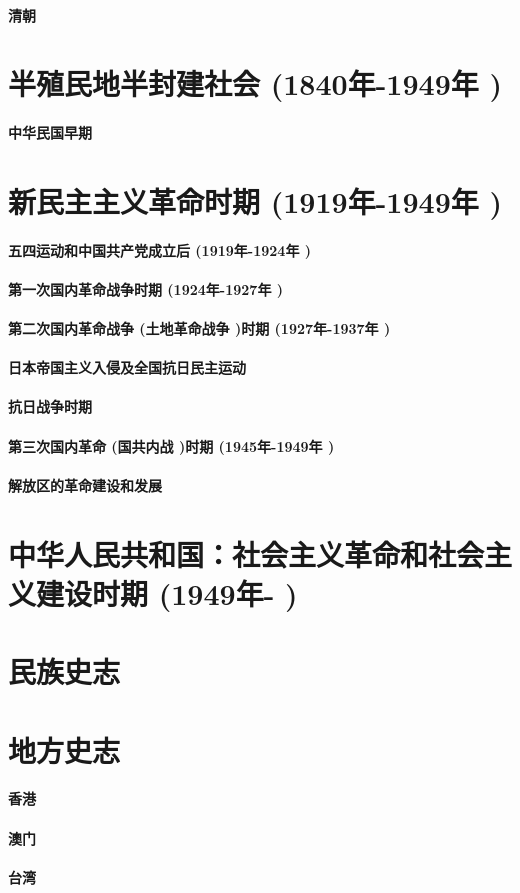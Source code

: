 \documentclass[UTF8]{../../RepresentationUniverse}
\begin{document}
    \subsubsection{清朝}
\chapter{半殖民地半封建社会 (1840年-1949年 )}
    \subsubsection{中华民国早期}
\chapter{新民主主义革命时期 (1919年-1949年 )}
    \subsubsection{五四运动和中国共产党成立后 (1919年-1924年 )}
    \subsubsection{第一次国内革命战争时期 (1924年-1927年 )}
    \subsubsection{第二次国内革命战争 (土地革命战争 )时期 (1927年-1937年 )}
    \subsubsection{日本帝国主义入侵及全国抗日民主运动}
    \subsubsection{抗日战争时期}
    \subsubsection{第三次国内革命 (国共内战 )时期 (1945年-1949年 )}
    \subsubsection{解放区的革命建设和发展}
\chapter{中华人民共和国：社会主义革命和社会主义建设时期 (1949年- )}
\chapter{民族史志}
\chapter{地方史志}
    \subsubsection{香港}
    \subsubsection{澳门}
    \subsubsection{台湾}
\end{document}
